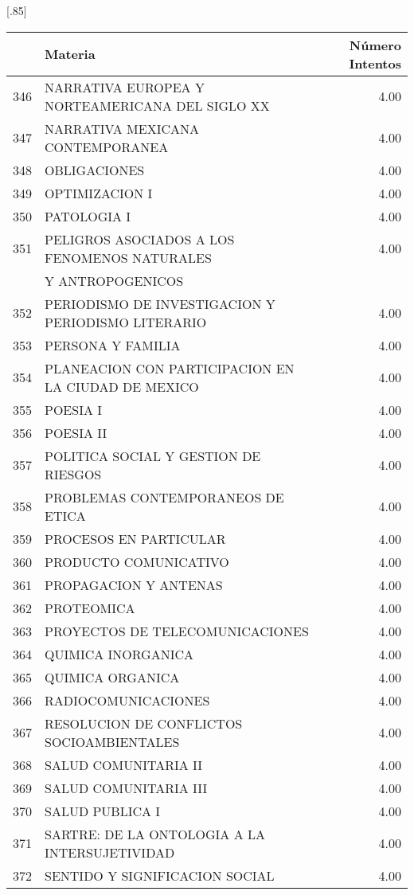 \documentclass[12pt]{article}
\begin{document}
\begin{table}[ht]
\centering
\scalebox{0.75}[.85]{
\begin{tabular}{rlr}
  \hline
 & Materia & N\'umero Intentos \\ 
  \hline
  346 & NARRATIVA EUROPEA Y NORTEAMERICANA DEL SIGLO XX & 4.00 \\ 
  347 & NARRATIVA MEXICANA CONTEMPORANEA & 4.00 \\ 
  348 & OBLIGACIONES & 4.00 \\ 
  349 & OPTIMIZACION I & 4.00 \\ 
  350 & PATOLOGIA I & 4.00 \\ 
  351 & PELIGROS ASOCIADOS A LOS FENOMENOS NATURALES  & 4.00 \\ 
   &  Y ANTROPOGENICOS & \\ 
  352 & PERIODISMO DE INVESTIGACION Y PERIODISMO LITERARIO & 4.00 \\ 
  353 & PERSONA Y FAMILIA & 4.00 \\ 
  354 & PLANEACION CON PARTICIPACION EN LA CIUDAD DE MEXICO & 4.00 \\ 
  355 & POESIA I & 4.00 \\ 
  356 & POESIA II & 4.00 \\ 
  357 & POLITICA SOCIAL Y GESTION DE RIESGOS & 4.00 \\ 
  358 & PROBLEMAS CONTEMPORANEOS DE ETICA & 4.00 \\ 
  359 & PROCESOS EN PARTICULAR & 4.00 \\ 
  360 & PRODUCTO COMUNICATIVO & 4.00 \\ 
  361 & PROPAGACION Y ANTENAS & 4.00 \\ 
  362 & PROTEOMICA & 4.00 \\ 
  363 & PROYECTOS DE TELECOMUNICACIONES & 4.00 \\ 
  364 & QUIMICA INORGANICA & 4.00 \\ 
  365 & QUIMICA ORGANICA & 4.00 \\ 
  366 & RADIOCOMUNICACIONES & 4.00 \\ 
  367 & RESOLUCION DE CONFLICTOS SOCIOAMBIENTALES & 4.00 \\ 
  368 & SALUD COMUNITARIA II & 4.00 \\ 
  369 & SALUD COMUNITARIA III & 4.00 \\ 
  370 & SALUD PUBLICA I & 4.00 \\ 
  371 & SARTRE: DE LA ONTOLOGIA A LA INTERSUJETIVIDAD & 4.00 \\ 
  372 & SENTIDO Y SIGNIFICACION SOCIAL & 4.00 \\ 

\end{tabular}}
\end{table}
\end{document}
